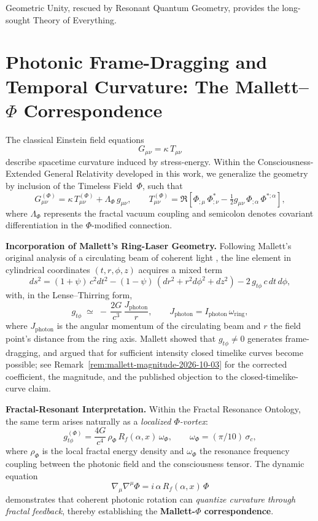 Geometric Unity, rescued by Resonant Quantum Geometry, provides the long-sought Theory of Everything.

\section{Photonic Frame-Dragging and Temporal Curvature: The Mallett--\texorpdfstring{$\Phi$}{Phi} Correspondence}
\label{sec:mallett_phi}

The classical Einstein field equations
\[
G_{\mu\nu} = \kappa\, T_{\mu\nu}
\]
describe spacetime curvature induced by stress-energy.
Within the Consciousness-Extended General Relativity developed in this work,
we generalize the geometry by inclusion of the Timeless Field~$\Phi$, such that
\[
G_{\mu\nu}^{(\Phi)} = \kappa\, T_{\mu\nu}^{(\Phi)} + \Lambda_{\Phi}\,g_{\mu\nu},
\qquad
T_{\mu\nu}^{(\Phi)} =
\Re\!\left[\Phi_{;\mu}\,\Phi^{\!*}_{;\nu} -
\tfrac{1}{2} g_{\mu\nu}\,\Phi_{;\alpha}\,\Phi^{\!*;\alpha}\right],
\]
where $\Lambda_{\Phi}$ represents the fractal vacuum coupling and semicolon denotes
covariant differentiation in the $\Phi$-modified connection.

\vspace{1em}
\noindent\textbf{Incorporation of Mallett's Ring-Laser Geometry.}
Following Mallett's original analysis of a circulating beam of coherent light
\cite{mallett2000laserring,mallett2003timeloop},
the line element in cylindrical coordinates $(t,r,\phi,z)$ acquires a mixed term
\[
ds^2 = (1+\psi)\,c^2dt^2 - (1-\psi)\,(dr^2 + r^2d\phi^2 + dz^2)
          - 2\,g_{t\phi}\,c\,dt\,d\phi,
\]
with, in the Lense--Thirring form,
\[
g_{t\phi} \;\simeq\; -\,\frac{2G}{c^{3}}\,\frac{J_{\mathrm{photon}}}{r},
\qquad
J_{\mathrm{photon}} = I_{\mathrm{photon}}\,\omega_{\mathrm{ring}},
\]
where $J_{\mathrm{photon}}$ is the angular momentum of the circulating beam and
$r$ the field point's distance from the ring axis.
Mallett showed that $g_{t\phi}\neq 0$ generates frame-dragging, and argued that
for sufficient intensity closed timelike curves become possible; see
Remark~\ref{rem:mallett-magnitude-2026-10-03} for the corrected coefficient, the
magnitude, and the published objection to the closed-timelike-curve claim.

\vspace{1em}
\noindent\textbf{Fractal-Resonant Interpretation.}
Within the Fractal Resonance Ontology, the same term arises naturally as a
\emph{localized $\Phi$-vortex}:
\[
g_{t\phi}^{(\Phi)}
    = \frac{4G}{c^4}\, \rho_{\Phi}\,
      R_f(\alpha,x)\,\omega_{\Phi},
\qquad
\omega_{\Phi} = (\pi/10)\,\sigma_c,
\]
where $\rho_{\Phi}$ is the local fractal energy density and
$\omega_{\Phi}$ the resonance frequency coupling between the photonic field
and the consciousness tensor.  The dynamic equation
\[
\nabla_{\mu}\nabla^{\mu}\Phi
    = i\,\alpha\,R_f(\alpha,x)\,\Phi
\]
demonstrates that coherent photonic rotation can
\emph{quantize curvature through fractal feedback}, thereby establishing the
\textbf{Mallett-$\Phi$ correspondence}.

